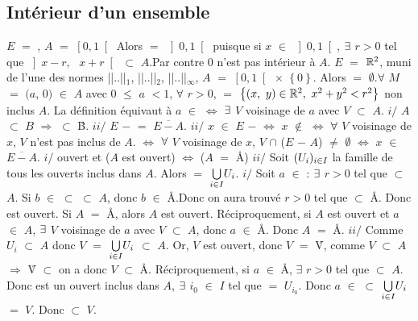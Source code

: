 \documentclass{article}
\begin{document}
\subsection{Intérieur d'un ensemble}
\ex $E$ $=$ \R, $A$ $=$ $\left[ 0, 1 \right[$
Alors \Ao $=$ $\left] 0, 1 \right[$ puisque si $x$ $\in$ $\left] 0, 1 \right[$, $\exists$ $r>0$ tel que $\left] x - r,\text{ } x + r \right[$
$\subset$ $A$.\s  Par contre $0$ n'est pas intérieur à $A$. \s
$E$ $=$ $\mathbb{R}^2$, muni de l'une des normes ||..||$_1$, ||..||$_2$, ||..||$_{\infty}$, $A$ $=$ $\left[ 0, 1 \right[$ $\times$ $\left\{ 0 \right\}$. Alors \Ao $=$ $\emptyset$.\s $\forall$ $M$ $=$ $(a$, $0)$ $\in$ $A$ avec $0$ $\leqslant$ $a$ $<1$, $\forall$ $r>0$,  $=$ $\left\{ (x, \text{ }y) \in \mathbb{R}^2, \text{ }x^2 + y^2< r^2 \right\}$ non inclus $A$.
\remarque
La définition équivaut à $a$ $\in$ \Ao $\Longleftrightarrow$ $\exists$ $V$ voisinage de $a$ avec $V$ $\subset$ $A$.
\proprietes
$i/$ $A$ $\subset$ $B$ $\Longrightarrow$ \Ao $\subset$ \r B. \s
$ii/$ $E$ $-$ \Ao $=$ $\overline{E - A}$.
\demo
$ii/$ $x$ $\in$ $E$ $-$ \Ao $\Longleftrightarrow$ $x$ $\notin$ \Ao $\Longleftrightarrow$ $\forall$ $V$ voisinage de $x$, $V$ n'est pas inclus de $A$. $\Longleftrightarrow$ $\forall$ $V$ voisinage de $x$, \s $V$ $\cap$ ($E$ $-$ $A$) $\neq$ $\emptyset$ $\Longleftrightarrow$  $x$ $\in$ $\overline{E - A}$.
\corollaire
$i/$ \Ao ouvert et ($A$ est ouvert) $\Longleftrightarrow$ ($A$ $=$ \AA) \s
$ii/$ Soit $(U_i)_{i \in I}$ la famille de tous les ouverts inclus dans $A$. Alors \Ao $=$ $\underset{i \in I}{\bigcup}U_i$.
\demo $i/$ Soit $a$ $\in$ \Ao: $\exists$ $r>0$ tel que  $\subset$ $A$. Si $b$ $\in$  $\subset$  $\subset$ $A$, donc $b$ $\in$ \AA.\s Donc on aura trouvé $r>0$ tel que  $\subset$ \AA. Donc \Ao est ouvert. 
Si $A$ $=$ \AA, alors $A$ est ouvert. \s Réciproquement, si $A$ est ouvert et $a$ $\in$ $A$, $\exists$ $V$ voisinage de $a$ avec $V$ $\subset$ $A$, donc $a$ $\in$ \AA. Donc $A$ $=$ \AA. \s
$ii/$ Comme $U_i$ $\subset$ $A$ donc $V$ $=$ $\underset{i \in I}{\bigcup}U_i$ $\subset$ $A$. Or, $V$ est ouvert, donc $V$ $=$ \r V, comme $V$ $\subset$ $A$ $\Longrightarrow$ \r V $\subset$ \Ao on a \s donc $V$ $\subset$ \AA. \s
Réciproquement, si $a$ $\in$ \AA, $\exists$ $r>0$ tel que  $\subset$ $A$. Donc  est un ouvert inclus dans $A$,  $\exists$ $i_0$ $\in$ $I$ \s tel que  $=$ $U_{i_{0}}$. Donc $a$ $\in$  $\subset$ $\underset{i \in I}{\bigcup}U_i$ $=$ $V$. Donc \Ao $\subset$ $V$.
\end{document}
